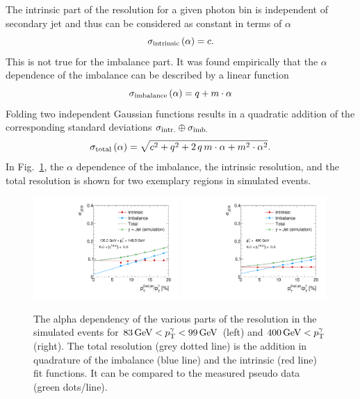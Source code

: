 The intrinsic part of the resolution for a given photon \pt bin is independent of secondary jet \pt and thus can be considered as constant in terms of $\alpha$
\begin{equation}\label{eq:intrinsic}
 \sigma_\mathrm{intrinsic} \left( \alpha\right) = c.
\end{equation}
This is not true for the imbalance part. It was found empirically that the $\alpha$ dependence of the imbalance can be described by a linear function 
\begin{equation}\label{eq:imbalance}
  \sigma_\mathrm{imbalance} \left( \alpha\right) = q + m \cdot \alpha
\end{equation}
Folding two independent Gaussian functions results in a quadratic addition of the corresponding standard deviations $\sigma_\mathrm{intr.}\oplus\sigma_\mathrm{imb.}$ 
\begin{equation}\label{eq:total}
  \sigma_\mathrm{total} \left( \alpha \right) = \sqrt{ c^2 + q^2  + 2\, q\, m \cdot \alpha +m^2 \cdot \alpha^2}. 
\end{equation}
In Fig.~\ref{fig:AlphaDependenceOfResolutions}, the $\alpha$ dependence of the imbalance, the intrinsic resolution, and the total resolution is shown for two exemplary \ptgamma regions in simulated events. 
\begin{figure}[!b]
 \centering
    \includegraphics[width=0.49\textwidth]{figures/resolution/methodology/JER_for_1_eta_bin_5_pTGamma_bin_wo_data_PFCHS_RMS99_mc.pdf} 
    \includegraphics[width=0.49\textwidth]{figures/resolution/methodology/JER_for_1_eta_bin_12_pTGamma_bin_wo_data_PFCHS_RMS99_mc.pdf} 
  \caption{The alpha dependency of the various parts of the resolution in the simulated events for $83 \,\text{Ge}\kern-0.06667em\text{V} < p_{\text{T}}^{\gamma} < 99 \,\text{Ge}\kern-0.06667em\text{V} $ (left) and $400 \,\text{Ge}\kern-0.06667em\text{V} < p_{\text{T}}^{\gamma}$ (right). 
           The total resolution (grey dotted line) is the addition in quadrature of the imbalance (blue line) and the intrinsic (red line) fit functions. 
           It can be compared to the measured pseudo data (green dots/line).}  
 \label{fig:AlphaDependenceOfResolutions}
\end{figure}
